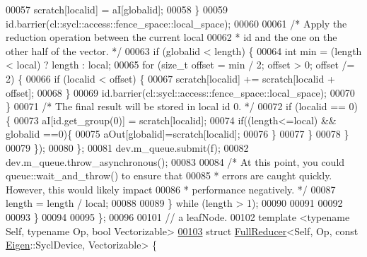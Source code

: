 \begin{DoxyCode}
00057                     scratch[localid] = aI[globalid];
00058                   \}
00059                   \textcolor{keywordtype}{id}.barrier(cl::sycl::access::fence\_space::local\_space);
00060 
00061                   \textcolor{comment}{/* Apply the reduction operation between the current local}
00062 \textcolor{comment}{                   * id and the one on the other half of the vector. */}
00063                   \textcolor{keywordflow}{if} (globalid < length) \{
00064                     \textcolor{keywordtype}{int} min = (length < local) ? length : local;
00065                     \textcolor{keywordflow}{for} (\textcolor{keywordtype}{size\_t} offset = min / 2; offset > 0; offset /= 2) \{
00066                       \textcolor{keywordflow}{if} (localid < offset) \{
00067                         scratch[localid] += scratch[localid + offset];
00068                       \}
00069                       \textcolor{keywordtype}{id}.barrier(cl::sycl::access::fence\_space::local\_space);
00070                     \}
00071                     \textcolor{comment}{/* The final result will be stored in local id 0. */}
00072                     \textcolor{keywordflow}{if} (localid == 0) \{
00073                       aI[\textcolor{keywordtype}{id}.get\_group(0)] = scratch[localid];
00074                       \textcolor{keywordflow}{if}((length<=local) && globalid ==0)\{
00075                         aOut[globalid]=scratch[localid];
00076                       \}
00077                     \}
00078                   \}
00079                 \});
00080           \};
00081             dev.m\_queue.submit(f);
00082             dev.m\_queue.throw\_asynchronous();
00083 
00084           \textcolor{comment}{/* At this point, you could queue::wait\_and\_throw() to ensure that}
00085 \textcolor{comment}{           * errors are caught quickly. However, this would likely impact}
00086 \textcolor{comment}{           * performance negatively. */}
00087           length = length / local;
00088 
00089         \} \textcolor{keywordflow}{while} (length > 1);
00090 
00091 
00092 
00093 \}
00094 
00095 \};
00096 
00101 \textcolor{comment}{// a leafNode.}
00102 \textcolor{keyword}{template} <\textcolor{keyword}{typename} Self, \textcolor{keyword}{typename} Op, \textcolor{keywordtype}{bool} Vectorizable>
\hyperlink{struct_eigen_1_1internal_1_1_full_reducer_3_01_self_00_01_op_00_01const_01_eigen_1_1_sycl_device_00_01_vectorizable_01_4}{00103} \textcolor{keyword}{struct }\hyperlink{struct_eigen_1_1internal_1_1_full_reducer}{FullReducer}<Self, Op, const \hyperlink{namespace_eigen}{Eigen}::SyclDevice, Vectorizable> \{

\end{DoxyCode}

